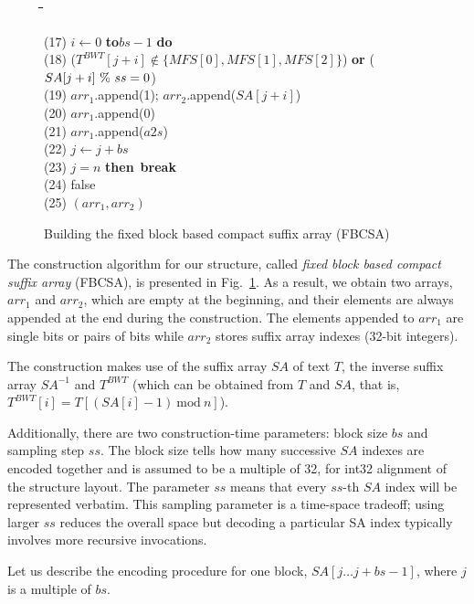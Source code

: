 \documentclass{cai}
\newcommand{\umod}{{\bf~\%~}\xspace}
\newcommand{\uassign}{\leftarrow}
\newcommand{\uif}{{\bf if}\xspace}
\newcommand{\uthen}{{\bf then}\xspace}
\newcommand{\uelse}{{\bf else}\xspace}
\newcommand{\uuntil}{{\bf until}\xspace}
\newcommand{\ufor}{{\bf for}\xspace}
\newcommand{\uto}{{\bf to}\xspace}
\newcommand{\udo}{{\bf do}\xspace}
\newcommand{\ureturn}{{\bf return}\xspace}
\newcommand{\ubreak}{{\bf break}\xspace}
\newcounter{lineno}
\newcommand{\utab}{\qquad}
\newcommand{\startindent}{\hspace{0.8em}}
\newenvironment{code}{\setcounter{lineno}{0}\begin{tabbing}
\utab\=\utab\=\utab\=\utab\=\utab\=\utab\=\utab\=\utab\=\utab\=\utab\=\utab\=\utab\=\utab\= \kill
}
{
\end{tabbing}\vspace{-2mm}
}
\def\mmod{~\textrm{mod}~}
\begin{document}
\begin{figure}
\begin{small}
\begin{code}
(17) \startindent \>\>\ufor $i \uassign 0$ \uto $bs-1$ \udo \\
(18) \startindent \>\>\>\uif ($T^{BWT}[j+i] \not\in \{MFS[0], MFS[1], MFS[2]\}$) \textbf{or} ($SA[j+i] \umod ss = 0$) \\ 
(19) \startindent \>\>\>\>\uthen $arr_1$.append(1); $arr_2$.append($SA[j+i]$) \\
(20) \startindent \>\>\>\uelse $arr_1$.append(0) \\
(21) \startindent \>\>$arr_1$.append($a2s$) \\
(22) \startindent \>\>$j \uassign j + bs$ \\
(23) \startindent \>\>\uif $j = n$ \uthen \ \ubreak \\
(24) \startindent \uuntil false \\
(25) \startindent \ureturn $(arr_1, arr_2)$ \\
\end{code}
\caption{Building the fixed block based compact suffix array (FBCSA)}
\label{fig:FBSA_build}
\end{small}
\end{figure}


The construction algorithm for our structure, called {\em fixed block based 
compact suffix array} (FBCSA), is presented in Fig.~\ref{fig:FBSA_build}.
As a result, we obtain two arrays, $arr_1$ and $arr_2$, which are empty 
at the beginning, and their elements are always appended at the end 
during the construction.
The elements appended to $arr_1$ are single bits or pairs of bits 
while $arr_2$ stores suffix array indexes (32-bit integers).

The construction makes use of the suffix array $SA$ of text $T$,
the inverse suffix array $SA^{-1}$ and $T^{BWT}$ (which can be obtained 
from $T$ and $SA$, that is, $T^{BWT}[i] = T[(SA[i] - 1) \mmod n]$).

Additionally, there are two construction-time parameters: 
block size $bs$ and sampling step $ss$.
The block size tells how many successive $SA$ indexes are encoded together 
and is assumed to be a multiple of 32, for int32 alignment of the structure 
layout.
The parameter $ss$ means that every $ss$-th $SA$ index will be 
represented verbatim.
This sampling parameter is a time-space tradeoff; 
using larger $ss$ reduces the overall space but decoding a particular SA index 
typically involves more recursive invocations.

Let us describe the encoding procedure for one block,
$SA[j \ldots j+bs-1]$, where $j$ is a multiple of $bs$.
\end{document}
